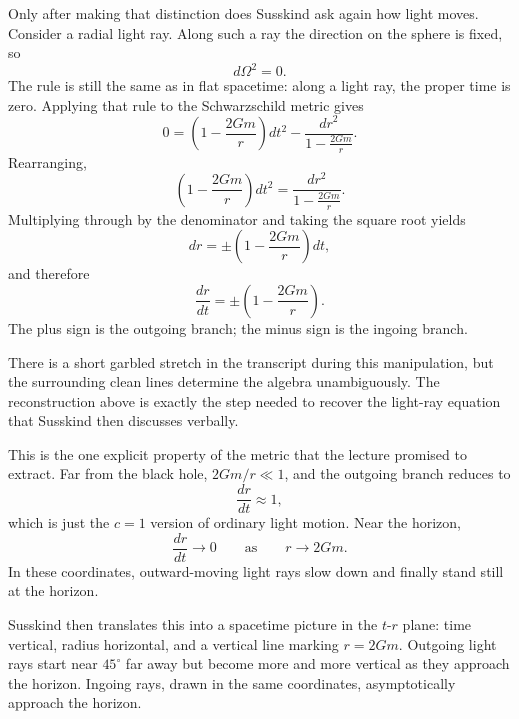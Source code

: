 Only after making that distinction does Susskind ask again how light moves. Consider a radial light ray. Along such a ray the direction on the sphere is fixed, so
\begin{equation}
d\Omega^2=0.
\end{equation}
The rule is still the same as in flat spacetime: along a light ray, the proper time is zero. Applying that rule to the Schwarzschild metric gives
\begin{equation}
0=
\left(1-\frac{2Gm}{r}\right)dt^2
-
\frac{dr^2}{1-\frac{2Gm}{r}}.
\end{equation}
Rearranging,
\begin{equation}
\left(1-\frac{2Gm}{r}\right)dt^2
=
\frac{dr^2}{1-\frac{2Gm}{r}}.
\end{equation}
Multiplying through by the denominator and taking the square root yields
\begin{equation}
dr=\pm\left(1-\frac{2Gm}{r}\right)dt,
\end{equation}
and therefore
\begin{equation}
\frac{dr}{dt}=\pm\left(1-\frac{2Gm}{r}\right).
\end{equation}
The plus sign is the outgoing branch; the minus sign is the ingoing branch.

\begin{remark}
There is a short garbled stretch in the transcript during this manipulation, but the surrounding clean lines determine the algebra unambiguously. The reconstruction above is exactly the step needed to recover the light-ray equation that Susskind then discusses verbally.
\end{remark}

This is the one explicit property of the metric that the lecture promised to extract. Far from the black hole, \(2Gm/r\ll 1\), and the outgoing branch reduces to
\begin{equation}
\frac{dr}{dt}\approx 1,
\end{equation}
which is just the \(c=1\) version of ordinary light motion. Near the horizon,
\begin{equation}
\frac{dr}{dt}\to 0
\qquad\text{as}\qquad
r\to 2Gm.
\end{equation}
In these coordinates, outward-moving light rays slow down and finally stand still at the horizon.

Susskind then translates this into a spacetime picture in the \(t\)-\(r\) plane: time vertical, radius horizontal, and a vertical line marking \(r=2Gm\). Outgoing light rays start near \(45^\circ\) far away but become more and more vertical as they approach the horizon. Ingoing rays, drawn in the same coordinates, asymptotically approach the horizon.

